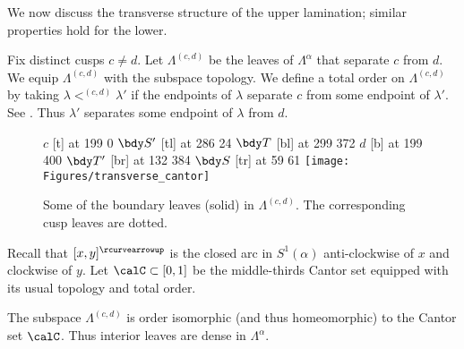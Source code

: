 \documentclass[12pt]{amsart}
\newcommand{\acw}{\rcurvearrowup}
\begin{document}
We now discuss the transverse structure of the upper lamination; similar properties hold for the lower.

\begin{definition}
\label{Def:LeavesThatLink}
Fix distinct cusps $c \neq d$.  Let $\Lambda^{(c, d)}$ be the leaves of $\Lambda^\alpha$ that separate $c$ from $d$.  We equip $\Lambda^{(c, d)}$ with the subspace topology.  We define a total order on $\Lambda^{(c, d)}$ by taking $\lambda <^{(c,d)} \lambda'$ if the endpoints of $\lambda$ separate $c$ from some endpoint of $\lambda'$.  See . 
Thus $\lambda'$ separates some endpoint of $\lambda$ from $d$. 
\end{definition}

\begin{figure}[htb]
\centering
{}
\small\hair 2pt
\pinlabel $c$ [t] at 199 0
\pinlabel $\bdy S'$ [tl] at 286 24
\pinlabel $\bdy T$ [bl] at 299 372
\pinlabel $d$ [b] at 199 400
\pinlabel $\bdy T'$ [br] at 132 384
\pinlabel $\bdy S$ [tr] at 59 61
\endlabellist
\texttt{[image: Figures/transverse\_cantor]}
\caption{Some of the boundary leaves (solid) in $\Lambda^{(c, d)}$.  The corresponding cusp leaves are dotted.}
\label{Fig:TotalOrder}
\end{figure}

Recall that $[x, y]^\acw$ is the closed arc in $S^1(\alpha)$ anti-clockwise of $x$ and clockwise of $y$.  Let $\calC \subset [0,1]$ be the middle-thirds Cantor set equipped with its usual topology and total order. 

\begin{lemma}
\label{Lem:Cantor}
The subspace $\Lambda^{(c, d)}$ is order isomorphic (and thus homeomorphic) to the Cantor set $\calC$.  Thus interior leaves are dense in $\Lambda^\alpha$. 
\end{lemma}
\end{document}
